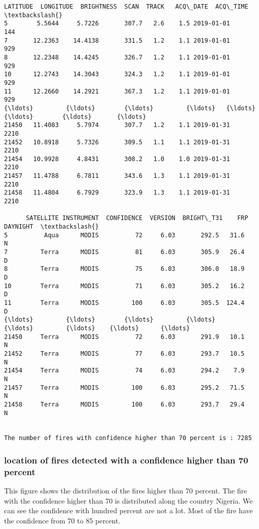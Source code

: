 \documentclass[11pt,a4paper]{article}
\begin{document}
    \begin{Verbatim}[commandchars=\\\{\}]
       LATITUDE  LONGITUDE  BRIGHTNESS  SCAN  TRACK   ACQ\_DATE  ACQ\_TIME  \textbackslash{}
5        5.5644     5.7226       307.7   2.6    1.5 2019-01-01       144
7       12.2363    14.4138       331.5   1.2    1.1 2019-01-01       929
8       12.2348    14.4245       326.7   1.2    1.1 2019-01-01       929
10      12.2743    14.3043       324.3   1.2    1.1 2019-01-01       929
11      12.2660    14.2921       367.3   1.2    1.1 2019-01-01       929
{\ldots}         {\ldots}        {\ldots}         {\ldots}   {\ldots}    {\ldots}        {\ldots}       {\ldots}
21450   11.4083     5.7974       307.7   1.2    1.1 2019-01-31      2210
21452   10.8918     5.7326       309.5   1.1    1.1 2019-01-31      2210
21454   10.9928     4.8431       308.2   1.0    1.0 2019-01-31      2210
21457   11.4788     6.7811       343.6   1.3    1.1 2019-01-31      2210
21458   11.4804     6.7929       323.9   1.3    1.1 2019-01-31      2210

      SATELLITE INSTRUMENT  CONFIDENCE  VERSION  BRIGHT\_T31    FRP DAYNIGHT  \textbackslash{}
5          Aqua      MODIS          72     6.03       292.5   31.6        N
7         Terra      MODIS          81     6.03       305.9   26.4        D
8         Terra      MODIS          75     6.03       306.0   18.9        D
10        Terra      MODIS          71     6.03       305.2   16.2        D
11        Terra      MODIS         100     6.03       305.5  124.4        D
{\ldots}         {\ldots}        {\ldots}         {\ldots}      {\ldots}         {\ldots}    {\ldots}      {\ldots}
21450     Terra      MODIS          72     6.03       291.9   10.1        N
21452     Terra      MODIS          77     6.03       293.7   10.5        N
21454     Terra      MODIS          74     6.03       294.2    7.9        N
21457     Terra      MODIS         100     6.03       295.2   71.5        N
21458     Terra      MODIS         100     6.03       293.7   29.4        N


The number of fires with confidence higher than 70 percent is : 7285
    \end{Verbatim}

    \hypertarget{the-locationfires-detected-with-a-confidence-higher-than-70-percent}{%
\subsubsection{location of fires detected with a confidence higher
than 70 
percent }\label{the-locationfires-detected-with-a-confidence-higher-than-70-percent}} 
    This figure shows the distribution of the fires higher than 70 percent.
The fire with the confidence higher than 70 is distributed along the
country Nigeria. We can see the confidence with hundred percent are not
a lot. Most of the fire have the confidence from 70 to 85 percent.
\end{document}
